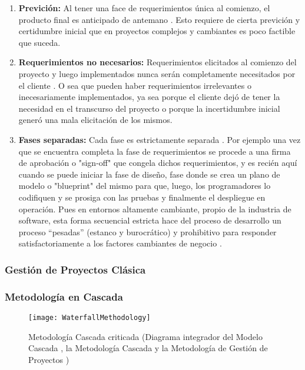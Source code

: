 \begin{enumerate}

\item \textbf{Previción:} Al tener una face de requerimientos única al comienzo, el producto final es anticipado de antemano \cite{Scrum-Institute-2015}. Esto requiere de cierta previción y certidumbre inicial que en proyectos complejos y cambiantes es poco factible que suceda.

\item \textbf{Requerimientos no necesarios:} Requerimientos elicitados al comienzo del proyecto y luego implementados nunca serán completamente necesitados por el cliente \cite{Scrum-Institute-2015}. O sea que pueden haber requerimientos irrelevantes o inecesariamente implementados, ya sea porque el cliente dejó de tener la necesidad en el transcurso del proyecto o porque la incertidumbre inicial generó una mala elicitación de los mismos.

\item \textbf{Fases separadas:} Cada fase es estrictamente separada \cite{Scrum-Institute-2015}. Por ejemplo una vez que se encuentra completa la fase de requerimientos se procede a una firma de aprobación o "sign-off" que congela dichos requerimientos, y es recién aquí cuando se puede iniciar la fase de diseño, fase donde se crea un plano de modelo o "blueprint" del mismo para que, luego, los programadores lo codifiquen y se prosiga con las pruebas y finalmente el despliegue en operación. Pues en entornos altamente cambiante, propio de la industria de software, esta forma secuencial estricta hace del proceso de desarrollo un proceso “pesadas” (estanco y burocrático) y prohibitivo para responder satisfactoriamente a los factores cambiantes de negocio \cite{Martin-Alaimo-2014}.

\end{enumerate}

\subsubsection{Gestión de Proyectos Clásica}

\subsubsection{Metodología en Cascada}

\begin{figure}[h]
  \centering
  \texttt{[image: WaterfallMethodology]}
  \caption{Metodología Cascada criticada (Diagrama integrador del Modelo Cascada \cite{Winston-Royce-1970}, la Metodología Cascada \cite{Ken-Schwaber-1995} y la Metodología de Gestión de Proyectos \cite{PMBOK-1996})}
  \centering
  \label{fig:WaterfallMethodology} %
\end{figure}
